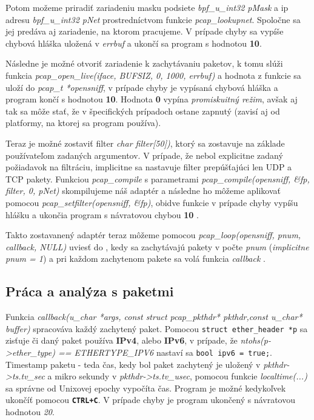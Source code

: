 \documentclass[11pt, a4paper]{article}
\begin{document}
	Potom možeme priradiť zariadeniu masku podsiete \emph{bpf\_u\_int32 pMask} a ip adresu  \emph{bpf\_u\_int32 pNet} prostredníctvom funkcie \emph{pcap\_lookupnet}. Spoločne sa jej predáva aj zariadenie, na ktorom pracujeme. V prípade chyby sa vypíše chybová hláška uložená v \emph{errbuf} a ukončí sa program s hodnotou \textbf{10}.
	
	Následne je možné otvoriť zariadenie k zachytávaniu paketov, k tomu slúži funkcia \emph{pcap\_open\_live(iface, BUFSIZ, 0, 1000, errbuf)} a hodnota z funkcie sa uloží do \emph{pcap\_t *opensniff}, v prípade chyby je vypísaná chybová hláška a program končí s hodnotou \textbf{10}. Hodnota \textbf{0} vypína \emph{promiskuitný režim}, avšak aj tak sa môže stať, že v špecifických prípadoch ostane zapnutý (zavisí aj od platformy, na ktorej sa program používa)\cite{WikiPromiscuity}.
	
	Teraz je možné zostaviť filter \emph{char filter[50])}, ktorý sa zostavuje na základe používateľom zadaných argumentov. V prípade, že nebol explicitne zadaný požiadavok na filtráciu, implicitne sa nastavuje filter prepúšťajúci len UDP a TCP pakety. Funkciou \emph{pcap\_compile} s parametrami \emph{pcap\_compile(opensniff, \&fp, filter, 0, pNet)} skompilujeme náš adaptér a následne ho môžeme aplikovať pomocou \emph{pcap\_setfilter(opensniff, \&fp)}, obidve funkcie v prípade chyby vypíšu hlášku a ukončia program s návratovou chybou \textbf{10} \cite{Tcpdump}. 
	
	Takto zostavanený adaptér teraz môžeme pomocou \emph{pcap\_loop(opensniff, pnum, callback, NULL)} uviesť do , kedy sa zachytávajú pakety v počte \emph{pnum} (\textit{implicitne pnum = 1}) a pri každom zachytenom pakete sa volá funkcia \emph{callback} \cite{Geeksniffer}.
	
	\subsection{Práca a analýza s paketmi} 
	Funkcia \emph{callback(u\_char *args, const struct pcap\_pkthdr* pkthdr,const u\_char* buffer)} spracováva každý zachytený paket. Pomocou \texttt{struct ether\_header *p} sa zisťuje či daný paket používa \textbf{IPv4}, alebo \textbf{IPv6}, v prípade, že \emph{ntohs(p->ether\_type) == ETHERTYPE\_IPV6} nastaví sa \texttt{bool ipv6 = true;}. Timestamp paketu - teda čas, kedy bol paket zachytený je uložený v \emph{pkthdr->ts.tv\_sec} a mikro sekundy v \emph{pkthdr->ts.tv\_usec}, pomocou funkcie \emph{localtime(...)} sa správne od Unixovej epochy vypočíta čas. Program je možné kedykoľvek ukončíť pomocou \texttt{\textbf{CTRL+C}}. V prípade chyby je program ukončený s návratovou hodnotou \emph{20}.
	
\end{document}
